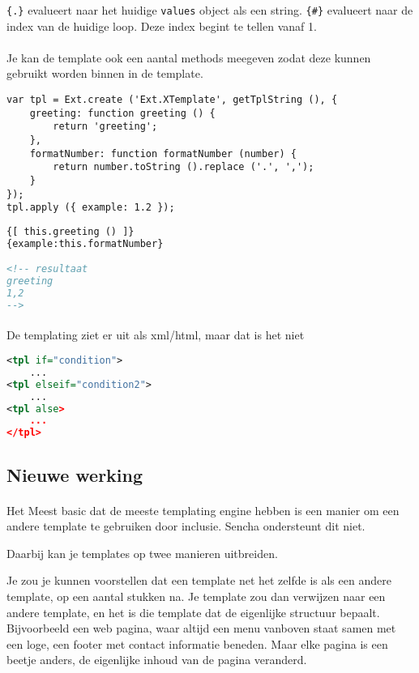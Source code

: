 \lstinline|{.}| evalueert naar het huidige \lstinline{values} object als een string.
\lstinline|{#}| evalueert naar de index van de huidige loop. Deze index begint te tellen
vanaf 1.

\paragraph {} Je kan de template ook een aantal methods meegeven zodat deze kunnen
gebruikt worden binnen in de template.

\begin{lstlisting}[language=ownjavascript]
var tpl = Ext.create ('Ext.XTemplate', getTplString (), {
	greeting: function greeting () {
		return 'greeting';
	},
	formatNumber: function formatNumber (number) {
		return number.toString ().replace ('.', ',');
	}
});
tpl.apply ({ example: 1.2 });
\end{lstlisting}

\begin{lstlisting}[language=xml]
{[ this.greeting () ]}
{example:this.formatNumber}

<!-- resultaat
greeting
1,2
-->
\end{lstlisting}

\paragraph {} De templating ziet er uit als xml/html, maar dat is het niet

\begin{lstlisting}[language=xml]
<tpl if="condition">
	...
<tpl elseif="condition2">
	...
<tpl alse>
	...
</tpl>
\end{lstlisting}


\subsection {Nieuwe werking}

\paragraph {}Het Meest basic dat de meeste templating engine hebben is een manier om een
andere template te gebruiken door inclusie. Sencha ondersteunt dit niet.

Daarbij kan je templates op twee manieren uitbreiden.

Je zou je kunnen voorstellen dat een
template net het zelfde is als een andere template, op een aantal stukken na. Je template
zou dan verwijzen naar een andere template, en het is die template dat de eigenlijke
structuur bepaalt. Bijvoorbeeld een web pagina, waar altijd een menu vanboven staat samen
met een loge, een footer met contact informatie beneden. Maar elke pagina is een beetje
anders, de eigenlijke inhoud van de pagina veranderd.

